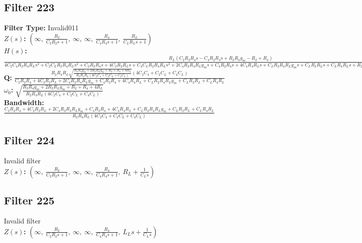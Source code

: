 \documentclass{article}
\begin{document}
\subsection*{Filter 223}
\textbf{Filter Type:} Invalid011 \\ 
\textbf{$Z(s)$:} $\left( \infty, \  \frac{R_{2}}{C_{2} R_{2} s + 1}, \  \infty, \  \infty, \  \frac{R_{4}}{C_{4} R_{4} s + 1}, \  \frac{R_{L}}{C_{L} R_{L} s + 1}\right)$ \\ 
\textbf{$H(s)$:} $\frac{R_{L} \left(C_{2} R_{2} R_{4} s - C_{4} R_{2} R_{4} s + R_{2} R_{4} g_{m} - R_{2} + R_{4}\right)}{4 C_{2} C_{4} R_{2} R_{4} R_{L} s^{2} + C_{2} C_{L} R_{2} R_{4} R_{L} s^{2} + C_{2} R_{2} R_{4} s + 4 C_{2} R_{2} R_{L} s + C_{4} C_{L} R_{2} R_{4} R_{L} s^{2} + 2 C_{4} R_{2} R_{4} R_{L} g_{m} s + C_{4} R_{2} R_{4} s + 4 C_{4} R_{4} R_{L} s + C_{L} R_{2} R_{4} R_{L} g_{m} s + C_{L} R_{2} R_{L} s + C_{L} R_{4} R_{L} s + R_{2} R_{4} g_{m} + 2 R_{2} R_{L} g_{m} + R_{2} + R_{4} + 4 R_{L}}$ \\ 
\textbf{Q:} $\frac{R_{2} R_{4} R_{L} \sqrt{\frac{R_{2} R_{4} g_{m} + 2 R_{2} R_{L} g_{m} + R_{2} + R_{4} + 4 R_{L}}{R_{2} R_{4} R_{L} \left(4 C_{2} C_{4} + C_{2} C_{L} + C_{4} C_{L}\right)}} \left(4 C_{2} C_{4} + C_{2} C_{L} + C_{4} C_{L}\right)}{C_{2} R_{2} R_{4} + 4 C_{2} R_{2} R_{L} + 2 C_{4} R_{2} R_{4} R_{L} g_{m} + C_{4} R_{2} R_{4} + 4 C_{4} R_{4} R_{L} + C_{L} R_{2} R_{4} R_{L} g_{m} + C_{L} R_{2} R_{L} + C_{L} R_{4} R_{L}}$ \\ 
\textbf{$\omega_0$:} $\sqrt{\frac{R_{2} R_{4} g_{m} + 2 R_{2} R_{L} g_{m} + R_{2} + R_{4} + 4 R_{L}}{R_{2} R_{4} R_{L} \left(4 C_{2} C_{4} + C_{2} C_{L} + C_{4} C_{L}\right)}}$ \\ 
\textbf{Bandwidth:} $\frac{C_{2} R_{2} R_{4} + 4 C_{2} R_{2} R_{L} + 2 C_{4} R_{2} R_{4} R_{L} g_{m} + C_{4} R_{2} R_{4} + 4 C_{4} R_{4} R_{L} + C_{L} R_{2} R_{4} R_{L} g_{m} + C_{L} R_{2} R_{L} + C_{L} R_{4} R_{L}}{R_{2} R_{4} R_{L} \left(4 C_{2} C_{4} + C_{2} C_{L} + C_{4} C_{L}\right)}$ \\ 
\subsection*{Filter 224}
Invalid filter \\ 
\textbf{$Z(s)$:} $\left( \infty, \  \frac{R_{2}}{C_{2} R_{2} s + 1}, \  \infty, \  \infty, \  \frac{R_{4}}{C_{4} R_{4} s + 1}, \  R_{L} + \frac{1}{C_{L} s}\right)$ \\ 
\subsection*{Filter 225}
Invalid filter \\ 
\textbf{$Z(s)$:} $\left( \infty, \  \frac{R_{2}}{C_{2} R_{2} s + 1}, \  \infty, \  \infty, \  \frac{R_{4}}{C_{4} R_{4} s + 1}, \  L_{L} s + \frac{1}{C_{L} s}\right)$ \\ 
\end{document}
